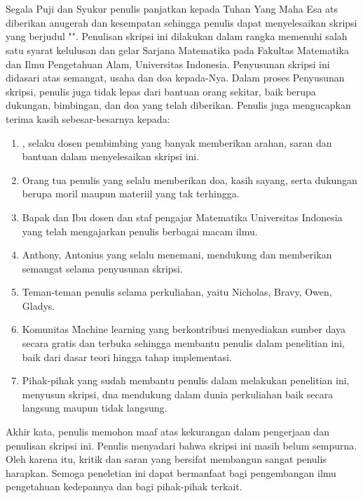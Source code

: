 \chapter*{\kataPengantar}
\pagestyle{first-pages}

Segala Puji dan Syukur penulis panjatkan kepada Tuhan Yang Maha Esa ats diberikan anugerah dan kesempatan sehingga penulis dapat menyelesaikan skripsi yang berjudul "\judul". Penulisan skripsi ini dilakukan dalam rangka memenuhi salah satu syarat kelulusan dan gelar Sarjana Matematika pada Fakultas Matematika dan Ilmu Pengetahuan Alam, Universitas Indonesia. Penyusunan skripsi ini didasari atas semangat, usaha dan doa kepada-Nya. Dalam proses Penyusunan skripsi, penulis juga tidak lepas dari bantuan orang sekitar, baik berupa dukungan, bimbingan, dan doa yang telah diberikan. Penulis juga mengucapkan terima kasih sebesar-besarnya kepada:

\begin{enumerate}
	\item \pembimbingSatu, selaku dosen pembimbing yang banyak memberikan arahan, saran dan bantuan dalam menyelesaikan skripsi ini.
	\item Orang tua penulis yang selalu memberikan doa, kasih sayang, serta dukungan berupa moril maupun materiil yang tak terhingga. 
	\item Bapak dan Ibu dosen dan staf pengajar Matematika Universitas Indonesia yang telah mengajarkan penulis berbagai macam ilmu.
	\item Anthony, Antonius yang selalu menemani, mendukung dan memberikan semangat selama penyusunan skripsi.
	\item Teman-teman penulis selama perkuliahan, yaitu Nicholas, Bravy, Owen, Gladys.
	\item Komunitas \f{Machine learning} yang berkontribusi menyediakan sumber daya secara gratis dan terbuka sehingga membantu penulis dalam penelitian ini, baik dari dasar teori hingga tahap implementasi.
	\item Pihak-pihak yang sudah membantu penulis dalam melakukan penelitian ini, menyusun skripsi, dna mendukung dalam dunia perkuliahan baik secara langsung maupun tidak langsung.
\end{enumerate}

Akhir kata, penulis memohon maaf atas kekurangan dalam pengerjaan dan penulisan skripsi ini. Penulis menyadari bahwa skripsi ini masih belum sempurna. Oleh karena itu, kritik dan saran yang bersifat membangun sangat penulis harapkan. Semoga peneletian ini dapat bermanfaat bagi pengembangan ilmu pengetahuan kedepannya dan bagi pihak-pihak terkait.
 
